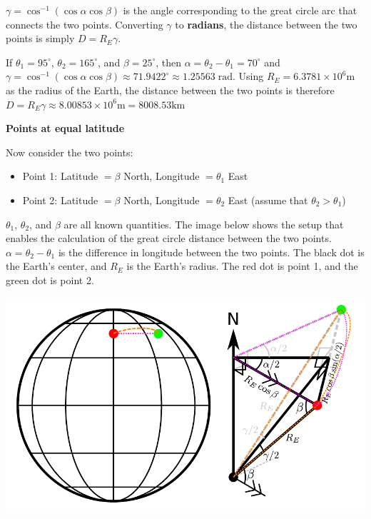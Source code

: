 \documentclass{article}
\begin{document}
\(\gamma = \cos^{-1}(\cos\alpha \cos\beta)\) is the angle corresponding to the great circle arc that connects the two points. Converting \(\gamma\) to {\bf radians}, the distance between the two points is simply \(D = R_E \gamma\).

If \(\theta_1 = 95^\circ\), \(\theta_2 = 165^\circ\), and \(\beta = 25^\circ\), then \(\alpha = \theta_2 - \theta_1 = 70^\circ\) and \(\gamma = \cos^{-1}(\cos\alpha \cos\beta) \approx 71.9422^\circ \approx 1.25563 \;\text{rad}\). Using \(R_E = 6.3781 \times 10^6\text{m}\) as the radius of the Earth, the distance between the two points is therefore \(D = R_E \gamma \approx 8.00853 \times 10^6 \text{m} = 8008.53\text{km}\)

\vspace{5mm}

\textbf{Points at equal latitude}

Now consider the two points: 
\begin{itemize}
\item Point 1: Latitude \( = \beta\) North, Longitude \(= \theta_1\) East
\item Point 2: Latitude \( = \beta\) North, Longitude \(= \theta_2\) East (assume that \(\theta_2 > \theta_1\))
\end{itemize}

\(\theta_1\), \(\theta_2\), and \(\beta\) are all known quantities. The image below shows the setup that enables the calculation of the great circle distance between the two points. \(\alpha = \theta_2 - \theta_1\) is the difference in longitude between the two points. The black dot is the Earth's center, and \(R_E\) is the Earth's radius. The red dot is point 1, and the green dot is point 2.

\includegraphics[width = \textwidth]{distances_at_equal_latitude}
\end{document}
